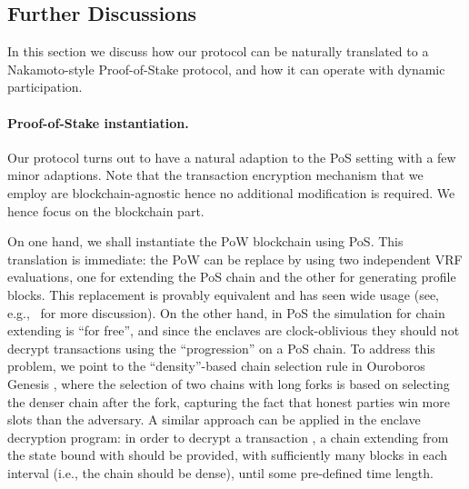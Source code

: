 \subsection{Further Discussions}
\label{subsec:further-discussions}

In this section we discuss how our protocol can be naturally translated to a Nakamoto-style Proof-of-Stake protocol, and how it can operate with dynamic participation.

\paragraph{Proof-of-Stake instantiation.}
%
Our protocol turns out to have a natural adaption to the PoS setting with a few minor adaptions.
%
Note that the transaction encryption mechanism that we employ are blockchain-agnostic hence no additional modification is required.
%
We hence focus on the blockchain part.

On one hand, we shall instantiate the \twoforone PoW blockchain using PoS.
%
This translation is immediate: the \twoforone PoW can be replace by using two independent VRF evaluations, one for extending the PoS chain and the other for generating profile blocks.
%
This replacement is provably equivalent and has seen wide usage (see, e.g.,~\cite{TCC:FGKR20} for more discussion).
%
On the other hand, in PoS the simulation for chain extending is ``for free'', and since the enclaves are clock-oblivious they should not decrypt transactions using the ``progression'' on a PoS chain.
%
To address this problem, we point to the ``density''-based chain selection rule in Ouroboros Genesis \cite{CCS:BGKRZ18}, where the selection of two chains with long forks is based on selecting the denser chain after the fork, capturing the fact that honest parties win more slots than the adversary.
%
A similar approach can be applied in the enclave decryption program: in order to decrypt a transaction \tx, a chain extending from the state bound with \tx should be provided, with sufficiently many blocks in each interval (i.e., the chain should be dense), until some pre-defined time length.

